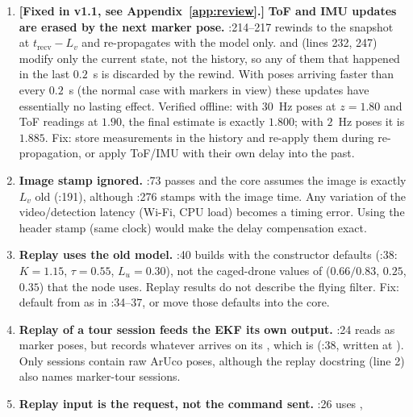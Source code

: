 \begin{review}
\begin{enumerate}[leftmargin=*]
\item \textcolor{OliveGreen}{\textbf{[Fixed in v1.1, see Appendix~\ref{app:review}.]}} \textbf{ToF and IMU updates are erased by the next marker pose.} :214--217 rewinds to the snapshot
  at $t_{\text{recv}}-L_v$ and re-propagates with the model only.  and 
  (lines 232, 247) modify only the current state, not the history, so any of them that happened in the last $0.2$~s is
  discarded by the rewind. With poses arriving faster than every $0.2$~s (the normal case with markers in view) these
  updates have essentially no lasting effect. Verified offline: with $30$~Hz poses at $z=1.80$ and ToF readings at $1.90$,
  the final estimate is exactly $1.800$; with $2$~Hz poses it is $1.885$. Fix: store measurements in the history and
  re-apply them during re-propagation, or apply ToF/IMU with their own delay into the past.
\item \textbf{Image stamp ignored.} :73 passes  and the core assumes the image is exactly
  $L_v$ old (:191), although :276 stamps  with the image
  time. Any variation of the video/detection latency (Wi-Fi, CPU load) becomes a timing error. Using the header stamp
  (same clock) would make the delay compensation exact.
\item \textbf{Replay uses the old model.} :40 builds  with the constructor
  defaults (:38: $K=1.15$, $\tau=0.55$, $L_u=0.30$), not the caged-drone values of 
  ($0.66/0.83$, $0.25$, $0.35$) that the node uses. Replay results do not describe the flying filter. Fix: default
   from  as in :34--37, or move those defaults into the core.
\item \textbf{Replay of a tour session feeds the EKF its own output.} :24 reads 
  as marker poses, but  records whatever arrives on its , which is 
  (:38, written at ). Only  sessions contain raw ArUco
  poses, although the replay docstring (line 2) also names marker-tour sessions.
\item \textbf{Replay input is the request, not the command sent.} :26 uses ,

\end{enumerate}
\end{review}
